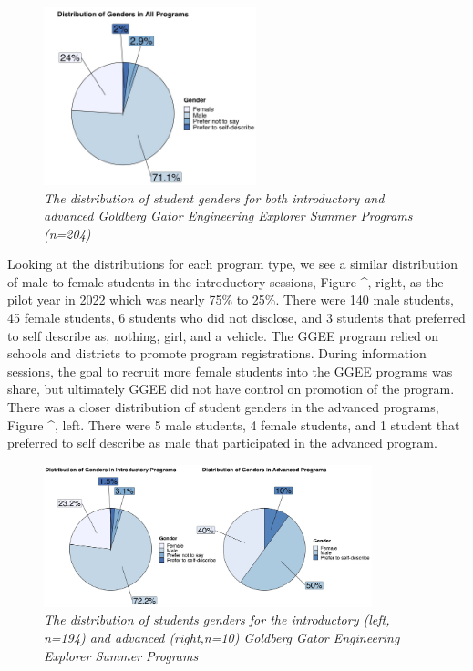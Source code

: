 \documentclass[
]{article}
\begin{document}
\begin{figure}
\centering
\includegraphics[width=0.55\textwidth,height=\textheight]{Graphs/Report/GGEE_23_Gender_All.jpg}
\caption{\emph{The distribution of student genders for both introductory
and advanced Goldberg Gator Engineering Explorer Summer Programs
(n=204)}}
\end{figure}

Looking at the distributions for each program type, we see a similar
distribution of male to female students in the introductory sessions,
Figure \^{}, right, as the pilot year in 2022 which was nearly 75\% to
25\%. There were 140 male students, 45 female students, 6 students who
did not disclose, and 3 students that preferred to self describe as,
nothing, girl, and a vehicle. The GGEE program relied on schools and
districts to promote program registrations. During information sessions,
the goal to recruit more female students into the GGEE programs was
share, but ultimately GGEE did not have control on promotion of the
program. There was a closer distribution of student genders in the
advanced programs, Figure \^{}, left. There were 5 male students, 4
female students, and 1 student that preferred to self describe as male
that participated in the advanced program.

\begin{figure}
\centering
\includegraphics[width=0.85\textwidth,height=\textheight]{Graphs/Report/GGEE_23_Gender_IA.jpg}
\caption{\emph{The distribution of students genders for the introductory
(left, n=194) and advanced (right,n=10) Goldberg Gator Engineering
Explorer Summer Programs}}
\end{figure}
\end{document}
